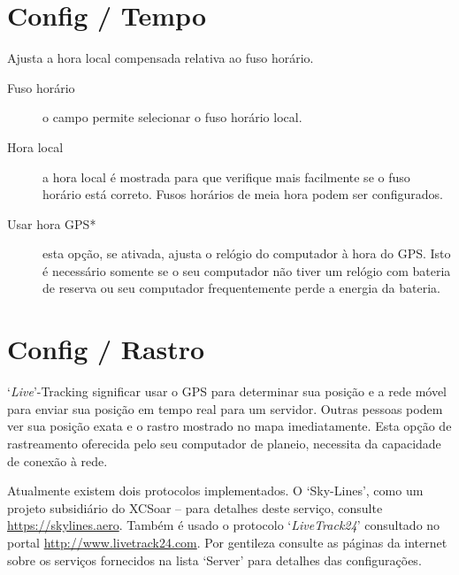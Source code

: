 \section{Config / Tempo}

Ajusta a hora local compensada relativa ao fuso horário.

\begin{description}
\item[Fuso horário]  o campo permite selecionar o fuso horário local.
\item[Hora local]  a hora local é mostrada para que verifique mais facilmente se o fuso horário está correto.  Fusos horários de meia hora podem ser configurados.
\item[Usar hora GPS*] esta opção, se ativada, ajusta o relógio do computador à hora do GPS.  Isto é necessário somente se o seu computador não tiver um relógio com bateria de reserva ou seu computador frequentemente perde a energia da bateria.
\end{description}


\section{Config / Rastro}

`{\it Live}'-Tracking significar usar o GPS para determinar sua posição e a rede móvel para enviar sua posição em tempo real para um servidor.  Outras pessoas podem ver sua posição exata e o rastro mostrado no mapa imediatamente.  Esta opção de rastreamento oferecida pelo seu computador de planeio, necessita da capacidade de conexão à rede.  

Atualmente existem dois protocolos implementados. O ‘Sky-Lines’, como um projeto subsidiário do XCSoar – para detalhes deste serviço, consulte
\url{https://skylines.aero}. 
Também é usado o protocolo  `{\em LiveTrack24}' consultado no portal  \url{http://www.livetrack24.com}.  
Por gentileza consulte as páginas da internet sobre os serviços fornecidos na lista ‘Server’ para detalhes das configurações.

